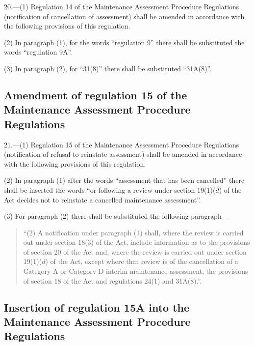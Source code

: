 \documentclass[12pt,a4paper]{article}
\begin{document}
20.—(1) Regulation 14 of the Maintenance Assessment Procedure Regulations (notification of cancellation of assessment) shall be amended in accordance with the following provisions of this regulation.

(2) In paragraph (1), for the words “regulation 9” there shall be substituted the words “regulation 9A”.

(3) In paragraph (2), for “31(8)” there shall be substituted “31A(8)”.

\subsection[21. Amendment of regulation 15 of the Maintenance Assessment Procedure Regulations]{Amendment of regulation 15 of the Maintenance Assessment Procedure Regulations}

21.—(1) Regulation 15 of the Maintenance Assessment Procedure Regulations (notification of refusal to reinstate assessment) shall be amended in accordance with the following provisions of this regulation.

(2) In paragraph (1) after the words “assessment that has been cancelled” there shall be inserted the words “or following a review under section 19(1)($d$) of the Act decides not to reinstate a cancelled maintenance assessment”.

(3) For paragraph (2) there shall be substituted the following paragraph—
\begin{quotation}
“(2) A notification under paragraph (1) shall, where the review is carried out under section 18(3) of the Act, include information as to the provisions of section 20 of the Act and, where the review is carried out under section 19(1)($d$) of the Act, except where that review is of the cancellation of a Category A or Category D interim maintenance assessment, the provisions of section 18 of the Act and regulations 24(1) and 31A(8).”.
\end{quotation}

\subsection[22. Insertion of regulation 15A into the Maintenance Assessment Procedure Regulations]{Insertion of regulation 15A into the Maintenance Assessment Procedure Regulations}
\end{document}
